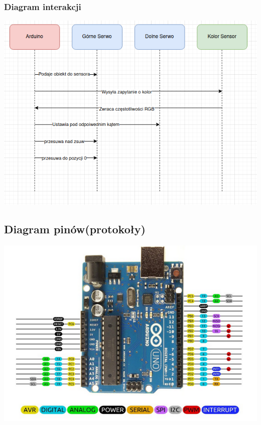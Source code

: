 \documentclass[12pt]{article}
\begin{document}
\subsubsection{Diagram interakcji}
\hspace{-1.75cm}%
    \includegraphics[scale=0.8]{inter.png}

\subsection{Diagram pinów(protokoły)}
\hspace{-1.75cm}%
\includegraphics[scale=0.8]{protocol_ex.png}
\end{document}
